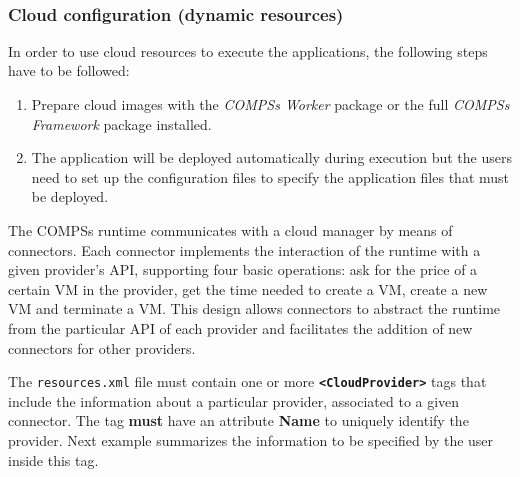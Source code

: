 ~ \newline

\subsubsection{Cloud configuration (dynamic resources)}
In order to use cloud resources to execute the applications, the following steps have to be followed:
\begin{enumerate}
 \item Prepare cloud images with the \textit{COMPSs Worker} package or the full \textit{COMPSs Framework} package installed.
 \item The application will be deployed automatically during execution but the users need to set up the configuration files to
 specify the application files that must be deployed.
\end{enumerate}

The COMPSs runtime communicates with a cloud manager by means of connectors. Each connector implements
the interaction of the runtime with a given provider's API, supporting four basic
operations: ask for the price of a certain VM in the provider, get the time needed to create a VM,
create a new VM and terminate a VM. This design allows connectors to abstract the runtime from the particular API
of each provider and facilitates the addition of new connectors for other providers.

The \texttt{resources.xml} file must contain one or more \textbf{\texttt{<CloudProvider>}} tags
that include the information about a particular provider, associated to a given connector. The tag \textbf{must} have an
attribute \textbf{Name} to uniquely identify the provider. Next example summarizes the information to be specified by the
user inside this tag.

\newpage

